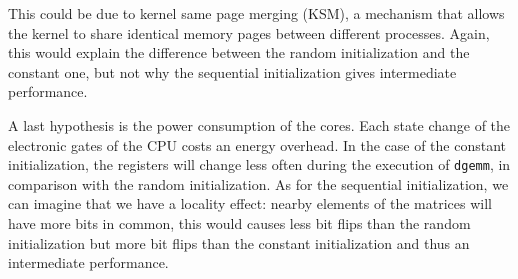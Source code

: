             This could be due to kernel same page merging (KSM), a mechanism that allows the kernel to share identical
            memory pages between different processes. Again, this would explain the difference between the random
            initialization and the constant one, but not why the sequential initialization gives intermediate
            performance.

            A last hypothesis is the power consumption of the cores. Each state change of the electronic gates of the
            CPU costs an energy overhead. In the case of the constant initialization, the registers will change less
            often during the execution of \texttt{dgemm}, in comparison with the random initialization. As for the
            sequential initialization, we can imagine that we have a locality effect: nearby elements of the matrices
            will have more bits in common, this would causes less bit flips than the random initialization but more bit
            flips than the constant initialization and thus an intermediate performance.

